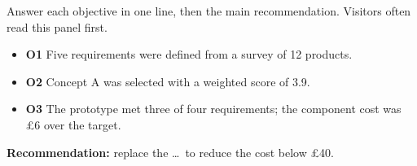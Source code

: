 \begin{guidance}
Answer each objective in one line, then the main recommendation. Visitors
often read this panel first.
\end{guidance}

\begin{itemize}
  \item \textbf{O1} Five requirements were defined from a survey of 12 products.
  \item \textbf{O2} Concept A was selected with a weighted score of 3.9.
  \item \textbf{O3} The prototype met three of four requirements; the
    component cost was £6 over the target.
\end{itemize}

\textbf{Recommendation:} replace the \ldots\ to reduce the cost below £40.
